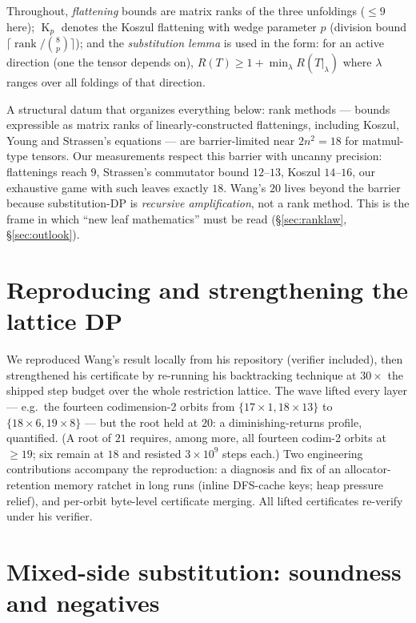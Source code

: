 \documentclass[11pt]{article}
\theoremstyle{definition}
\newcommand{\rk}{\operatorname{rank}}
\newcommand{\kos}{\operatorname{K}}
\begin{document}
Throughout, \emph{flattening} bounds are matrix ranks of the three
unfoldings ($\le 9$ here); $\kos_p$ denotes the Koszul flattening with wedge
parameter $p$ (division bound $\lceil \rk/\binom{8}{p}\rceil$); and the
\emph{substitution lemma} is used in the form: for an active direction
(one the tensor depends on), $R(T) \ge 1 + \min_\lambda R(T|_{\lambda})$
where $\lambda$ ranges over all foldings of that direction.

A structural datum that organizes everything below: rank methods ---
bounds expressible as matrix ranks of linearly-constructed flattenings,
including Koszul, Young and Strassen's equations --- are barrier-limited
near $2n^2 = 18$ for matmul-type tensors. Our measurements respect this
barrier with uncanny precision: flattenings reach $9$, Strassen's
commutator bound $12$--$13$, Koszul $14$--$16$, our exhaustive game with
such leaves exactly $18$. Wang's $20$ lives beyond the barrier because
substitution-DP is \emph{recursive amplification}, not a rank method. This
is the frame in which ``new leaf mathematics'' must be read
(\S\ref{sec:ranklaw}, \S\ref{sec:outlook}).

\section{Reproducing and strengthening the lattice DP}

We reproduced Wang's result locally from his repository (verifier
included), then strengthened his certificate by re-running his
backtracking technique at $30\times$ the shipped step budget over the whole
restriction lattice. The wave lifted every layer --- e.g.\ the fourteen
codimension-2 orbits from $\{17{\times}1, 18{\times}13\}$ to
$\{18{\times}6, 19{\times}8\}$ --- but the root held at $20$: a
diminishing-returns profile, quantified. (A root of $21$ requires, among
more, all fourteen codim-2 orbits at $\ge 19$; six remain at $18$ and
resisted $3\times 10^9$ steps each.) Two engineering contributions
accompany the reproduction: a diagnosis and fix of an allocator-retention
memory ratchet in long runs (inline DFS-cache keys; heap pressure relief),
and per-orbit byte-level certificate merging. All lifted certificates
re-verify under his verifier.

\section{Mixed-side substitution: soundness and negatives}
\label{sec:mixed}
\end{document}
